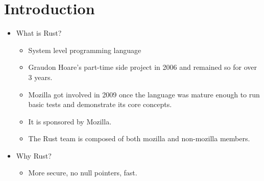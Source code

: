 \section{Introduction}
\begin{itemize}
    \item What is Rust?
        \begin{itemize}
            \item System level programming language
            \item Graudon Hoare's part-time side project in 2006 and remained so for over 3 years.
            \item Mozilla got involved in 2009 once the language was mature enough to run basic tests and demonstrate its core concepts.
            \item It is sponsored by Mozilla.
            \item The Rust team is composed of both mozilla and non-mozilla members.
        \end{itemize}
    
    \item Why Rust?
        \begin{itemize}
            \item More secure, no null pointers, fast.
        \end{itemize}
\end{itemize}
